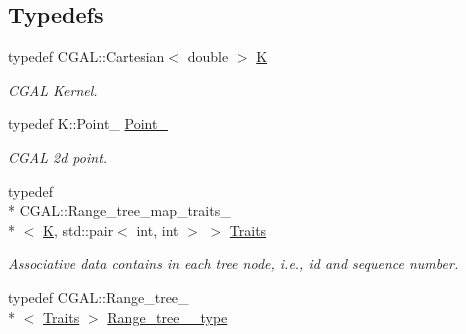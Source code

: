 \subsection*{Typedefs}
\begin{DoxyCompactItemize}
\item 
\hypertarget{namespaceSigSpatial2013_ac8dd3c84f0c3e96c95be4d4e6cf4325c}{typedef C\-G\-A\-L\-::\-Cartesian$<$ double $>$ \hyperlink{namespaceSigSpatial2013_ac8dd3c84f0c3e96c95be4d4e6cf4325c}{K}}\label{namespaceSigSpatial2013_ac8dd3c84f0c3e96c95be4d4e6cf4325c}

\begin{DoxyCompactList}\small\item\em C\-G\-A\-L Kernel. \end{DoxyCompactList}\item 
\hypertarget{namespaceSigSpatial2013_a4d50a6d98aab2aa905654c8c2e3e3c58}{typedef K\-::\-Point\-\_ \hyperlink{namespaceSigSpatial2013_a4d50a6d98aab2aa905654c8c2e3e3c58}{Point\-\_}}\label{namespaceSigSpatial2013_a4d50a6d98aab2aa905654c8c2e3e3c58}

\begin{DoxyCompactList}\small\item\em C\-G\-A\-L 2d point. \end{DoxyCompactList}\item 
\hypertarget{namespaceSigSpatial2013_a1f1ea2e2cdbee6d560fd28d9332b4a9e}{typedef \\*
C\-G\-A\-L\-::\-Range\-\_\-tree\-\_\-map\-\_\-traits\-\_\\*
$<$ \hyperlink{namespaceSigSpatial2013_ac8dd3c84f0c3e96c95be4d4e6cf4325c}{K}, std\-::pair$<$ int, int $>$ $>$ \hyperlink{namespaceSigSpatial2013_a1f1ea2e2cdbee6d560fd28d9332b4a9e}{Traits}}\label{namespaceSigSpatial2013_a1f1ea2e2cdbee6d560fd28d9332b4a9e}

\begin{DoxyCompactList}\small\item\em Associative data contains in each tree node, i.\-e., id and sequence number. \end{DoxyCompactList}\item 
\hypertarget{namespaceSigSpatial2013_a1f24a632c09e5f10b138ef0096857e43}{typedef C\-G\-A\-L\-::\-Range\-\_\-tree\-\_\\*
$<$ \hyperlink{namespaceSigSpatial2013_a1f1ea2e2cdbee6d560fd28d9332b4a9e}{Traits} $>$ \hyperlink{namespaceSigSpatial2013_a1f24a632c09e5f10b138ef0096857e43}{Range\-\_\-tree\-\_\-\_\-type}}\label{namespaceSigSpatial2013_a1f24a632c09e5f10b138ef0096857e43}


\end{DoxyCompactItemize}

